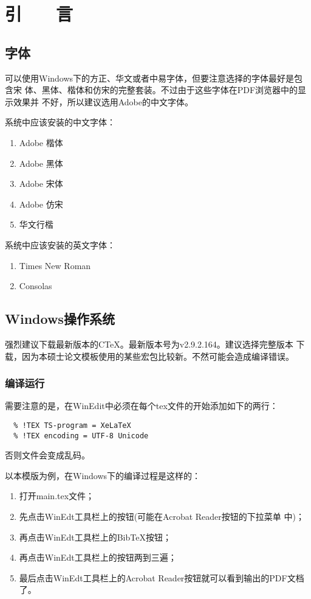 ﻿%

\chapter*{\hfill 引　　言 \hfill}
\label{chap00}

\section{字体}

可以使用Windows下的方正、华文或者中易字体，但要注意选择的字体最好是包含宋
体、黑体、楷体和仿宋的完整套装。不过由于这些字体在PDF浏览器中的显示效果并
不好，所以建议选用Adobe的中文字体。

系统中应该安装的中文字体：
\begin{enumerate}
\item Adobe 楷体
\item Adobe 黑体
\item Adobe 宋体
\item Adobe 仿宋
\item 华文行楷
\end{enumerate}

系统中应该安装的英文字体：
\begin{enumerate}
\item Times New Roman
\item Consolas
\end{enumerate}

\section{Windows操作系统}

强烈建议下载最新版本的C\TeX{}。最新版本号为v2.9.2.164。建议选择完整版本
下载，因为本硕士论文模板使用的某些宏包比较新。不然可能会造成编译错误。

\subsection{编译运行}

需要注意的是，在WinEdit中必须在每个tex文件的开始添加如下的两行：
\begin{lstlisting}
  % !TEX TS-program = XeLaTeX
  % !TEX encoding = UTF-8 Unicode
\end{lstlisting}
否则文件会变成乱码。

以本模版为例，在Windows下的编译过程是这样的：
\begin{enumerate}
\item 打开main.tex文件；
\item 先点击WinEdt工具栏上的\XeLaTeX{}按钮(可能在Acrobat Reader按钮的下拉菜单
  中)；
\item 再点击WinEdt工具栏上的Bib\TeX{}按钮；
\item 再点击WinEdt工具栏上的\XeLaTeX{}按钮两到三遍；
\item 最后点击WinEdt工具栏上的Acrobat Reader按钮就可以看到输出的PDF文档了。
\end{enumerate}


